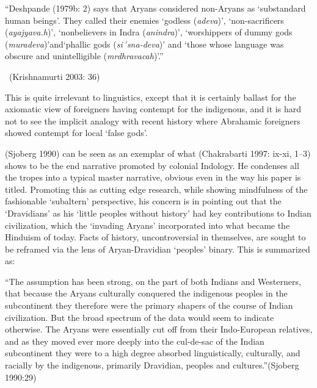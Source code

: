 \begin{myquote}
“Deshpande (1979b: 2) says that Aryans considered non-Aryans as ‘substandard human beings’. They called their enemies `godless (\textit{adeva})’, ‘non-sacrificers (\textit{ayajyava.h})’, ‘nonbelievers in Indra (\textit{anindra})’, ‘worshippers of dummy gods (\textit{muradeva})’and‘phallic gods (\textit{si´sna-deva})’ and ‘those whose language was obscure and unintelligible (\textit{mrdhravacah})’.” 

~\hfill (Krishnamurti 2003: 36)
\end{myquote}

This is quite irrelevant to linguistics, except that it is certainly ballast for the axiomatic view of foreigners having contempt for the indigenous, and it is hard not to see the implicit analogy with recent history where Abrahamic foreigners showed contempt for local ‘false gods’.

(Sjoberg 1990) can be seen as an exemplar of what (Chakrabarti 1997: ix-xi, 1–3) shows to be the end narrative promoted by colonial Indology. He condenses all the tropes into a typical master narrative, obvious even in the way his paper is titled. Promoting this as cutting edge research, while showing mindfulness of the fashionable ‘subaltern’ perspective, his concern is in pointing out that the ‘Dravidians’ as his ‘little peoples without history’ had key contributions to Indian civilization, which the ‘invading Aryans’ incorporated into what became the Hinduism of today. Facts of history, uncontroversial in themselves, are sought to be reframed via the lens of Aryan-Dravidian ‘peoples’ binary. This is summarized as:

\begin{myquote}
“The assumption has been strong, on the part of both Indians and Westerners, that because the Aryans culturally conquered the indigenous peoples in the subcontinent they therefore were the primary shapers of the course of Indian civilization. But the broad spectrum of the data would seem to indicate otherwise. The Aryans were essentially cut off from their Indo-European relatives, and as they moved ever more deeply into the cul-de-sac of the Indian subcontinent they were to a high degree absorbed linguistically, culturally, and racially by the indigenous, primarily Dravidian, peoples and cultures.”\hfill (Sjoberg 1990:29)
\end{myquote}

